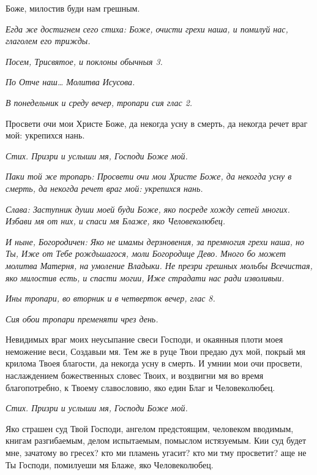    Боже, милостив буди нам грешным.


 \itshape Егда же достигнем сего стиха:\normalfont{} Боже, очисти грехи наша, и помилуй нас\itshape ,
глаголем его трижды.\normalfont{}


 \itshape Посем,\normalfont{} \itshape Трисвятое\normalfont{}, \itshape и поклоны обычныя 3\normalfont{}.


 \itshape По\normalfont{} Отче наш… \itshape Молитва Исусова\normalfont{}.


 \itshape В понедельник и среду вечер, тропари сия глас 2.\normalfont{}


   Просвети очи мои Христе Боже, да некогда усну в смерть, да некогда
речет враг мой: укрепихся нань.


 \itshape Стих.\normalfont{} Призри и услыши мя, Господи Боже мой.


 \itshape Паки той же тропарь:\normalfont{} Просвети очи мои Христе Боже, да некогда усну в
смерть, да некогда речет враг мой: укрепихся нань.


 \itshape Слава:\normalfont{} Заступник души моей буди Боже, яко посреде хожду сетей
многих. Избави мя от них, и спаси мя Блаже, яко Человеколюбец.


 \itshape И ныне, Богородичен:\normalfont{} Яко не имамы дерзновения, за премногия грехи
наша, но Ты, Иже от Тебе рождьшагося, моли Богородице Дево. Много бо
может молитва Матерня, на умоление Владыки. Не презри грешных мольбы
Всечистая, яко милостив есть, и спасти могии, Иже страдати нас ради
изволивыи.


 \itshape Ины тропари, во вторник и в четверток вечер, глас 8.\normalfont{}


 \itshape Сия обои тропари пременяти чрез день.\normalfont{}


   Невидимых враг моих неусыпание свеси Господи, и окаянныя плоти моея
неможение веси, Создавыи мя. Тем же в руце Твои предаю дух мой, покрый
мя крилома Твоея благости, да некогда усну в смерть. И умнии мои очи
просвети, наслаждением божественных словес Твоих, и воздвигни мя
во время благопотребно, к Твоему славословию, яко един Благ и
Человеколюбец.


 \itshape Стих.\normalfont{} Призри и услыши мя, Господи Боже мой.


   Яко страшен суд Твой Господи, ангелом предстоящим, человеком
вводимым, книгам разгибаемым, делом испытаемым, помыслом истязуемым.
Кии суд будет мне, зачатому во гресех? кто ми пламень угасит? кто
ми тму просветит? аще не Ты Господи, помилуеши мя Блаже, яко
Человеколюбец.


